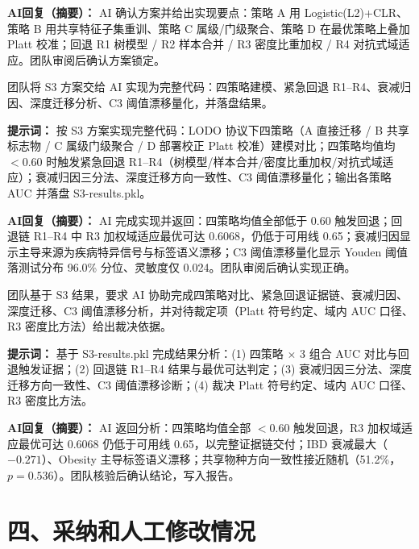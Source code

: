 \documentclass[12pt,a4paper]{ctexart}
\begin{document}
\begin{description}[leftmargin=*, itemindent=0pt, labelwidth=*, labelsep=0.5em]
\textbf{AI回复（摘要）：} AI 确认方案并给出实现要点：策略 A 用 Logistic(L2)+CLR、策略 B 用共享特征子集重训、策略 C 属级/门级聚合、策略 D 在最优策略上叠加 Platt 校准；回退 R1 树模型 / R2 样本合并 / R3 密度比重加权 / R4 对抗式域适应。团队审阅后确认方案锁定。

\item[\textbf{交互记录 [AI-3-2] —— S3 建模实现}]

团队将 S3 方案交给 AI 实现为完整代码：四策略建模、紧急回退 R1--R4、衰减归因、深度迁移分析、C3 阈值漂移量化，并落盘结果。

\textbf{提示词：} 按 S3 方案实现完整代码：LODO 协议下四策略（A 直接迁移 / B 共享标志物 / C 属级门级聚合 / D 部署校正 Platt 校准）建模对比；四策略均值均 $<$0.60 时触发紧急回退 R1--R4（树模型/样本合并/密度比重加权/对抗式域适应）；衰减归因三分法、深度迁移方向一致性、C3 阈值漂移量化；输出各策略 AUC 并落盘 S3-results.pkl。

\textbf{AI回复（摘要）：} AI 完成实现并返回：四策略均值全部低于 0.60 触发回退；回退链 R1--R4 中 R3 加权域适应最优可达 0.6068，仍低于可用线 0.65；衰减归因显示主导来源为疾病特异信号与标签语义漂移；C3 阈值漂移量化显示 Youden 阈值落测试分布 96.0\% 分位、灵敏度仅 0.024。团队审阅后确认实现正确。

\item[\textbf{交互记录 [AI-3-3] —— S3 结果分析}]

团队基于 S3 结果，要求 AI 协助完成四策略对比、紧急回退证据链、衰减归因、深度迁移、C3 阈值漂移分析，并对待裁定项（Platt 符号约定、域内 AUC 口径、R3 密度比方法）给出裁决依据。

\textbf{提示词：} 基于 S3-results.pkl 完成结果分析：(1) 四策略 $\times$ 3 组合 AUC 对比与回退触发证据；(2) 回退链 R1--R4 结果与最优可达判定；(3) 衰减归因三分法、深度迁移方向一致性、C3 阈值漂移诊断；(4) 裁决 Platt 符号约定、域内 AUC 口径、R3 密度比方法。

\textbf{AI回复（摘要）：} AI 返回分析：四策略均值全部 $<$0.60 触发回退，R3 加权域适应最优可达 0.6068 仍低于可用线 0.65，以完整证据链交付；IBD 衰减最大（$-0.271$）、Obesity 主导标签语义漂移；共享物种方向一致性接近随机（51.2\%，$p=0.536$）。团队核验后确认结论，写入报告。

\end{description}

\section*{四、采纳和人工修改情况}
\end{document}
